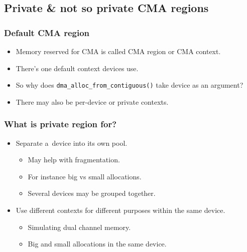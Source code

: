 \subsection{Private \& not so private CMA regions}

\begin{frame}
  \frametitle{Default CMA region}

  \begin{itemize}
  \item Memory reserved for CMA is called CMA region or CMA context.
  \item There's one default context devices use.
  \item So why does \lstinline|dma_alloc_from_contiguous()| take
    device as an argument?
  \item There may also be per-device or private contexts.
  \end{itemize}
\end{frame}

\begin{frame}
  \frametitle{What is private region for?}

  \begin{itemize}
  \item Separate a~device into its own pool.
    \begin{itemize}
    \item May help with fragmentation.
    \item For instance big vs small allocations.
    \item Several devices may be grouped together.
    \end{itemize}
  \item Use different contexts for different purposes within the same
    device.
    \begin{itemize}
    \item Simulating dual channel memory.
    \item Big and small allocations in the same device.
    \end{itemize}
  \end{itemize}
\end{frame}

